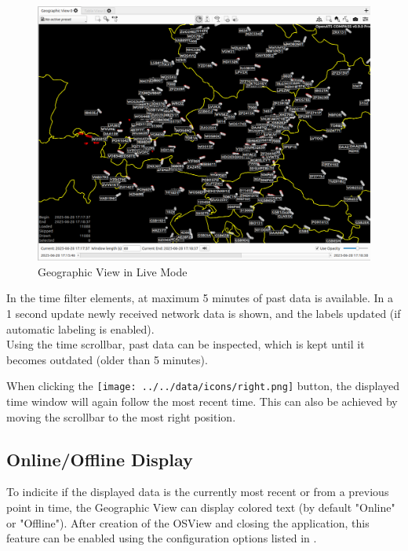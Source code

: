 \begin{figure}[H]
    \hspace*{-2.5cm}
    \includegraphics[width=19cm,frame]{figures/geo_live_mode.png}
  \caption{Geographic View in Live Mode}
\end{figure} 

In the time filter elements, at maximum 5 minutes of past data is available. In a 1 second update newly received network data is shown, and the labels updated (if automatic labeling is enabled). \\

Using the time scrollbar, past data can be inspected, which is kept until it becomes outdated (older than 5 minutes).

When clicking the \texttt{[image: ../../data/icons/right.png]} button, the displayed time window will again follow the most recent time. This can also be achieved by moving the scrollbar to the most right position.

\subsection{Online/Offline Display}

To indicite if the displayed data is the currently most recent or from a previous point in time, the Geographic View can display colored text (by default "Online" or "Offline"). After creation of the OSView and closing the application, this feature can be enabled using the configuration options listed in .

